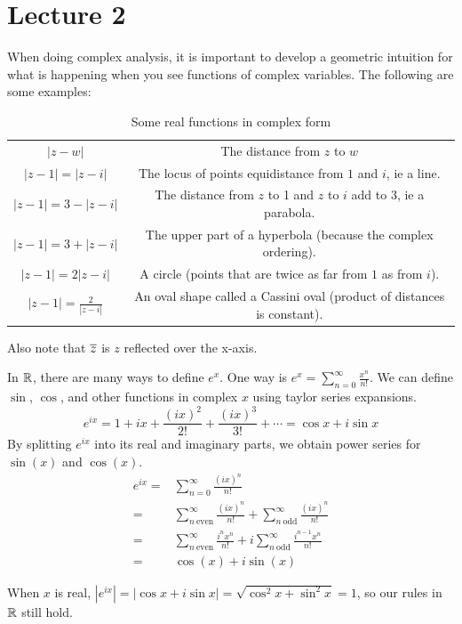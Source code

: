 \documentclass[11pt,leqno,oneside]{amsart}
\begin{document}
\section{Lecture 2}
When doing complex analysis, it is important to develop a geometric intuition
for what is happening when you see functions of complex variables. The
following are some examples:
\begin{table}
    \centering
    \begin{tabular}{|c|c|}
        \hline
        $|z-w|$ & The distance from $z$ to $w$ \\
        $|z-1|=|z-i|$ & The locus of points equidistance from $1$ and $i$, ie a line. \\
        $|z-1|=3-|z-i|$ & The distance from $z$ to 1 and $z$ to $i$ add to 3, ie a parabola. \\
        $|z-1|=3+|z-i|$ & The upper part of a hyperbola (because the complex ordering). \\
        $|z-1|=2|z-i|$ & A circle (points that are twice as far from $1$ as from $i$). \\
        $|z-1|=\frac{2}{|z-i|}$ & An oval shape called a Cassini oval (product of distances is constant). \\
        \hline
    \end{tabular}
    \caption{Some real functions in complex form}
    \label{tab:func-descs}
\end{table}
Also note that $\overline{z}$ is $z$ reflected over the x-axis.

In ${\mathbb R}$, there are many ways to define $e^x$. One way is $e^x =
\sum_{n=0}^\infty \frac{x^n}{n!}$. We can define $\sin$, $\cos$, and other functions in complex $x$ using taylor series expansions.
\[
    e^{ix} = 1 + ix + \frac{(ix)^2}{2!} + \frac{(ix)^3}{3!} + \cdots = \cos x + i \sin x
\]
By splitting $e^{ix}$ into its real and imaginary parts, we obtain power series for $\sin(x)$ and $\cos(x)$.
\begin{align*}
  e^{ix} =& \sum_{n=0}^\infty \frac{(ix)^n}{n!}  \\
  =& \sum_{n\ \text{even}}^\infty \frac{(ix)^n}{n!} + \sum_{n\ \text{odd}}^\infty \frac{(ix)^n}{n!} \\
  =& \sum_{n\ \text{even}}^\infty \frac{i^n x^n}{n!} + i\sum_{n\ \text{odd}}^\infty \frac{i^{n-1} x^n}{n!} \\
  =& \cos(x) + i \sin(x)
\end{align*}

When $x$ is real, $|e^{ix}| = |\cos x + i \sin x| = \sqrt{\cos^2 x + \sin^2 x}
= 1$, so our rules in ${\mathbb R}$ still hold.
\end{document}
